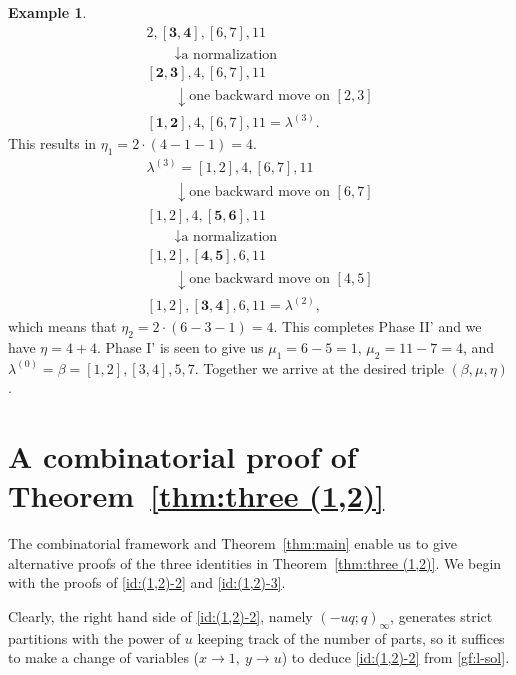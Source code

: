 \documentclass[11pt,reqno]{amsart}
\numberwithin{equation}{section}
\theoremstyle{plain}
\theoremstyle{definition}
\newtheorem{example}[theorem]{Example}
\def\la{\lambda}
\begin{document}
\begin{example}
$$\begin{gathered}
2, \mathbf{[3, 4]}, [6, 7], 11\\
\qquad \downarrow \text {a normalization}\\
\mathbf{[2, 3]}, 4, [6, 7], 11\\
\qquad \downarrow \text {one backward move on $[2, 3]$}\\
\mathbf{[1, 2]}, 4, [6, 7], 11=\la^{(3)}.
\end{gathered}
$$
This results in $\eta_{1}=2\cdot(4-1-1)=4$.
$$
\begin{gathered}
\la^{(3)}=[1, 2], 4, [6, 7], 11 \\
\qquad \downarrow \text {one backward move on $[6, 7]$}\\
[1, 2], 4, \mathbf{[5, 6]}, 11\\
\qquad \downarrow \text {a normalization}\\
[1, 2], \mathbf{[4, 5]}, 6, 11\\
\qquad \downarrow \text {one backward move on $[4, 5]$}\\
[1, 2], \mathbf{[3, 4]}, 6, 11=\la^{(2)},
\end{gathered}
$$
which means that $\eta_2=2\cdot(6-3-1)=4$. This completes Phase II' and we have $\eta=4+4$. Phase I' is seen to give us $\mu_{1}=6-5=1$, $\mu_{2}=11-7=4$, and $\la^{(0)}=\beta=[1, 2], [3, 4], 5, 7$. Together we arrive at the desired triple $(\beta,\mu,\eta)$.
\end{example}


\section{A combinatorial proof of Theorem~\ref{thm:three (1,2)}}\label{sec:3id}

The combinatorial framework and Theorem~\ref{thm:main} enable us to give alternative proofs of the three identities in Theorem~\ref{thm:three (1,2)}. We begin with the proofs of \eqref{id:(1,2)-2} and \eqref{id:(1,2)-3}.

Clearly, the right hand side of \eqref{id:(1,2)-2}, namely $(-uq;q)_{\infty}$, generates strict partitions with the power of $u$ keeping track of the number of parts, so it suffices to make a change of variables ($x\to 1,~y\to u$) to deduce \eqref{id:(1,2)-2} from \eqref{gf:l-sol}.
\end{document}

